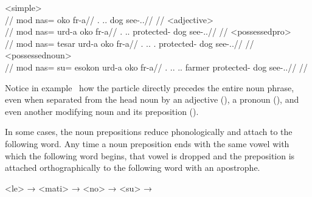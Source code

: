 	\a<simple>\begingl
		\glpreamble{}\\
		//
		\gla mod nas= oko fr-a//
		\glb \Fps.\Erg{} \An.\Pc.\Top{} dog see-\Ind.\Npst.\Ipfv//
		\glft {}//
	\endgl
	\a<adjective>\begingl
		\glpreamble{}\\
		//
		\gla mod nas= urd-a oko fr-a//
		\glb \Fps.\Erg{} \An.\Pc.\Top{} protected-\An{} dog see-\Ind.\Npst.\Ipfv//
		\glft {}//
	\endgl
	\a<possessedpro>\begingl
		\glpreamble{}\\
		//
		\gla mod nas= tesar urd-a oko fr-a//
		\glb \Fps.\Erg{} \An.\Pc.\Top{} \Spc.\Gen{} protected-\An{} dog see-\Ind.\Npst.\Ipfv//
		\glft {}//
	\endgl
	\a<possessednoun>\begingl
		\glpreamble{}\\
		//
		\gla mod nas= su= esokon urd-a oko fr-a//
		\glb \Fps.\Erg{} \An.\Pc.\Top{} \An.\Sg.\Gen{} farmer protected-\An{} dog see-\Ind.\Npst.\Ipfv//
		\glft {}//
	\endgl
\xe

Notice in example~ how the particle  directly precedes the entire noun phrase, even when separated from the head noun by an adjective (), a pronoun (), and even another modifying noun and its preposition ().

In some cases, the noun prepositions reduce phonologically and attach to the following word. Any time a noun preposition ends with the same vowel with which the following word begins, that vowel is dropped and the preposition is attached orthographically to the following word with an apostrophe.

	\a<le> →    
	\a<mati> →    
	\a<no> →    
	\a<su> →    
\xe

